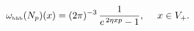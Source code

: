 \begin{equation}
\omega_{\mbox{\tiny bhb}} (N_p) (x)
= (2\pi)^{-3} \, 
\frac{1}{e^{\, 2 \eta x p} - 1}, \quad \ x \in V_+.
\end{equation}

